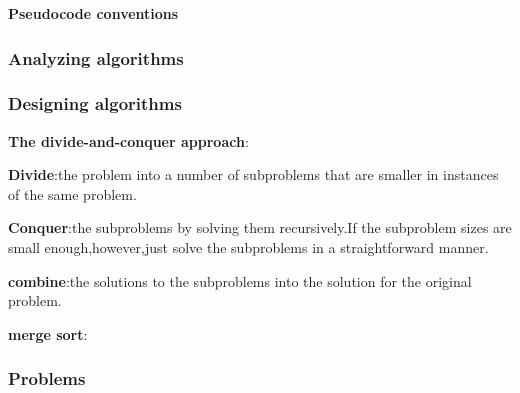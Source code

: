 \documentclass[UTF8,a4paper,12pt]{ctexart}
\begin{document}
                \textbf{Pseudocode conventions}
            \subsubsection{Analyzing algorithms}
            \subsubsection{Designing algorithms}
                \textbf{The divide-and-conquer approach}:
                
                \textbf{Divide}:the problem into a number of subproblems that are smaller in instances of the same problem.

                \textbf{Conquer}:the subproblems by solving them recursively.If the subproblem sizes are small enough,however,just solve the subproblems in a straightforward manner.

                \textbf{combine}:the solutions to the subproblems into the solution for the original problem.

                \textbf{merge sort}:

            \subsubsection{Problems}      
\end{document}
